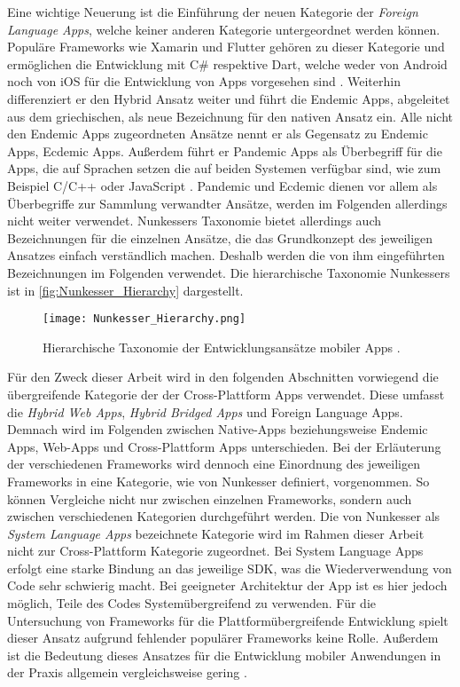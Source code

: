 Eine wichtige Neuerung ist die Einführung der neuen Kategorie der \textit{Foreign Language Apps}, welche keiner anderen Kategorie untergeordnet werden können.
Populäre Frameworks wie Xamarin und Flutter gehören zu dieser Kategorie und ermöglichen die Entwicklung mit C\# respektive Dart, welche weder von Android noch von iOS für die Entwicklung von Apps vorgesehen sind \cite{Xamarin_Einfuehrung} \cite{Fentaw_Thesis_Flutter}.
Weiterhin differenziert er den Hybrid Ansatz weiter und führt die Endemic Apps, abgeleitet aus dem griechischen, als neue Bezeichnung für den nativen Ansatz ein.
Alle nicht den Endemic Apps zugeordneten Ansätze nennt er als Gegensatz zu Endemic Apps, Ecdemic Apps.
Außerdem führt er Pandemic Apps als Überbegriff für die Apps, die auf Sprachen setzen die auf beiden Systemen verfügbar sind, wie zum Beispiel C/C++ oder JavaScript \cite{Nunkesser_Taxonomy_Apps}.
Pandemic und Ecdemic dienen vor allem als Überbegriffe zur Sammlung verwandter Ansätze, werden im Folgenden allerdings nicht weiter verwendet.
Nunkessers Taxonomie bietet allerdings auch Bezeichnungen für die einzelnen Ansätze, die das Grundkonzept des jeweiligen Ansatzes einfach verständlich machen.
Deshalb werden die von ihm eingeführten Bezeichnungen im Folgenden verwendet.
Die hierarchische Taxonomie Nunkessers ist in \autoref{fig:Nunkesser_Hierarchy} dargestellt.

\begin{figure}
    \centering
    \texttt{[image: Nunkesser\_Hierarchy.png]}
    \caption{Hierarchische Taxonomie der Entwicklungsansätze mobiler Apps \cite{Nunkesser_Taxonomy_Apps}.}
    \label{fig:Native_vs_CrossPlatform}
\end{figure}

Für den Zweck dieser Arbeit wird in den folgenden Abschnitten vorwiegend die übergreifende Kategorie der der Cross-Plattform Apps verwendet.
Diese umfasst die \textit{Hybrid Web Apps}, \textit{Hybrid Bridged Apps} und Foreign Language Apps.
Demnach wird im Folgenden zwischen Native-Apps beziehungsweise Endemic Apps, Web-Apps und Cross-Plattform Apps unterschieden.
Bei der Erläuterung der verschiedenen Frameworks wird dennoch eine Einordnung des jeweiligen Frameworks in eine Kategorie, wie von Nunkesser definiert, vorgenommen.
So können Vergleiche nicht nur zwischen einzelnen Frameworks, sondern auch zwischen verschiedenen Kategorien durchgeführt werden.
Die von Nunkesser als \textit{System Language Apps} bezeichnete Kategorie wird im Rahmen dieser Arbeit nicht zur Cross-Plattform Kategorie zugeordnet.
Bei System Language Apps erfolgt eine starke Bindung an das jeweilige \ac{SDK}, was die Wiederverwendung von Code sehr schwierig macht.
Bei geeigneter Architektur der App ist es hier jedoch möglich, Teile des Codes Systemübergreifend zu verwenden.
Für die Untersuchung von Frameworks für die Plattformübergreifende Entwicklung spielt dieser Ansatz aufgrund fehlender populärer Frameworks keine Rolle.
Außerdem ist die Bedeutung dieses Ansatzes für die Entwicklung mobiler Anwendungen in der Praxis allgemein vergleichsweise gering \cite{Nunkesser_Taxonomy_Apps}.

